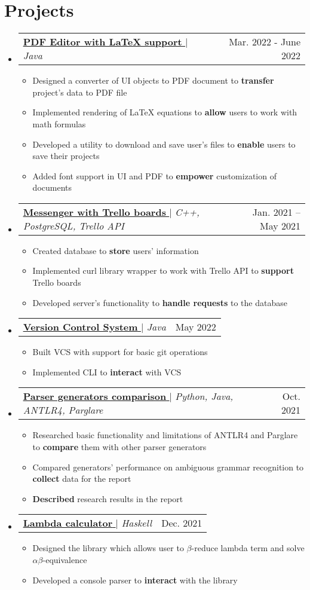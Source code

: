 \documentclass[english,russian,letterpaper,11pt]{article}
\makeatletter
\newcommand{\resumeItem}[1]{
  \item\small{
    {#1 \vspace{-2pt}}
  }
}
\newcommand{\resumeProjectHeading}[2]{
    \item
    \begin{tabular*}{0.97\textwidth}{l@{\extracolsep{\fill}}r}
      \small#1 & #2 \\
    \end{tabular*}\vspace{-7pt}
}
\newcommand{\resumeSubHeadingListStart}{\begin{itemize}[leftmargin=0.15in, label={}]}
\newcommand{\resumeSubHeadingListEnd}{\end{itemize}}
\newcommand{\resumeItemListStart}{\begin{itemize}}
\newcommand{\resumeItemListEnd}{\end{itemize}\vspace{-5pt}}
\makeatother
\begin{document}
\section{Projects}
    \resumeSubHeadingListStart
    \resumeProjectHeading
          {\href{https://github.com/Pdf-Creator/pdf-editor}{\underline{\textbf{PDF Editor with \LaTeX \xspace support}} \faGithub} $|$ \emph{Java}}{Mar. 2022 - June 2022}
          \resumeItemListStart
            \resumeItem{Designed a converter of UI objects to PDF document to \textbf{transfer} project's data to PDF file}
            \resumeItem{Implemented rendering of \LaTeX \xspace equations to \textbf{allow} users to work with math formulas}
            \resumeItem{Developed a utility to download and save user's files to \textbf{enable} users to save their projects}
            \resumeItem{Added font support in UI and PDF to \textbf{empower} customization of documents}
          \resumeItemListEnd
    \resumeProjectHeading
    {\href{https://github.com/alexbuyan/BPKproject}{\underline{\textbf{Messenger with Trello boards}} \faGithub} $|$ \emph{C++, PostgreSQL, Trello API}}{Jan. 2021 -- May 2021}
    \resumeItemListStart
      \resumeItem{Created database to \textbf{store} users' information}
      \resumeItem{Implemented curl library wrapper to work with Trello API to \textbf{support} Trello boards}
      \resumeItem{Developed server's functionality to \textbf{handle requests} to the database}
    \resumeItemListEnd
    \resumeProjectHeading
        {\href{https://drive.google.com/drive/folders/1-YddCqrIFbIl-l2cShHa2zDOYspZGKgq?usp=sharing}{\underline{\textbf{Version Control System}} \faGithub} $|$ \emph{Java}}{May 2022}
        \resumeItemListStart
          \resumeItem{Built VCS with support for basic git operations}
          \resumeItem{Implemented CLI to \textbf{interact} with VCS}
        \resumeItemListEnd
    \resumeProjectHeading
    {\href{https://github.com/Parser-Comparison/Parser-Comparison}{\underline{\textbf{Parser generators comparison}} \faGithub} $|$ \emph{Python, Java, ANTLR4, Parglare}}{Oct. 2021}
    \resumeItemListStart
    \resumeItem{Researched basic functionality and limitations of ANTLR4 and Parglare to \textbf{compare} them with other parser generators } \\
    \resumeItem{Compared generators' performance on ambiguous grammar recognition to \textbf{collect} data for the report} \\
    \resumeItem{\textbf{Described} research results in the report}
    \resumeItemListEnd
    \resumeProjectHeading
        {\href{https://github.com/alexbuyan/LambdaCalculator}{\underline{\textbf{Lambda calculator}} \faGithub} $|$ \emph{Haskell}}{Dec. 2021}
        \resumeItemListStart
          \resumeItem{Designed the library which allows user to $\beta$-reduce lambda term and solve $\alpha \beta$-equivalence} \\
          \resumeItem{Developed a console parser to \textbf{interact} with the library}
        \resumeItemListEnd
    \resumeSubHeadingListEnd
\end{document}
